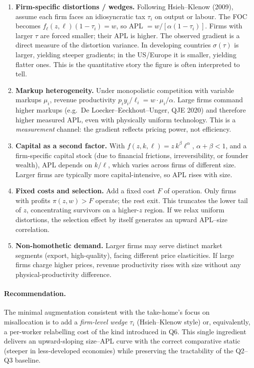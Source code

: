 \documentclass[11pt,a4paper]{article}
\begin{document}
\begin{enumerate}[leftmargin=*,itemsep=2pt]
    \item \textbf{Firm-specific distortions / wedges.} Following Hsieh--Klenow (2009), assume each firm faces an idiosyncratic tax $\tau_{i}$ on output or labour. The FOC becomes $f_{\ell}(z,\ell)(1-\tau_{i})=w$, so APL $=w/[\alpha(1-\tau_{i})]$. Firms with larger $\tau$ are forced smaller; their APL is higher. The observed gradient is a direct measure of the distortion variance. In developing countries $\sigma(\tau)$ is larger, yielding steeper gradients; in the US/Europe it is smaller, yielding flatter ones. This is the quantitative story the figure is often interpreted to tell.

    \item \textbf{Markup heterogeneity.} Under monopolistic competition with variable markups $\mu_{i}$, revenue productivity $p_{i}y_{i}/\ell_{i}=w\cdot\mu_{i}/\alpha$. Large firms command higher markups (e.g.\ De Loecker--Eeckhout--Unger, QJE 2020) and therefore higher measured APL, even with physically uniform technology. This is a \emph{measurement} channel: the gradient reflects pricing power, not efficiency.

    \item \textbf{Capital as a second factor.} With $f(z,k,\ell)=z\,k^{\beta}\ell^{\alpha}$, $\alpha+\beta<1$, and a firm-specific capital stock (due to financial frictions, irreversibility, or founder wealth), APL depends on $k/\ell$, which varies across firms of different size. Larger firms are typically more capital-intensive, so APL rises with size.

    \item \textbf{Fixed costs and selection.} Add a fixed cost $F$ of operation. Only firms with profits $\pi(z,w)>F$ operate; the rest exit. This truncates the lower tail of $z$, concentrating survivors on a higher-$z$ region. If we relax uniform distortions, the selection effect by itself generates an upward APL--size correlation.

    \item \textbf{Non-homothetic demand.} Larger firms may serve distinct market segments (export, high-quality), facing different price elasticities. If large firms charge higher prices, revenue productivity rises with size without any physical-productivity difference.
\end{enumerate}

\paragraph{Recommendation.}
The minimal augmentation consistent with the take-home's focus on misallocation is to add a \emph{firm-level wedge} $\tau_{i}$ (Hsieh--Klenow style) or, equivalently, a per-worker relabelling cost of the kind introduced in Q6. This single ingredient delivers an upward-sloping size--APL curve with the correct comparative static (steeper in less-developed economies) while preserving the tractability of the Q2--Q3 baseline.
\end{document}
